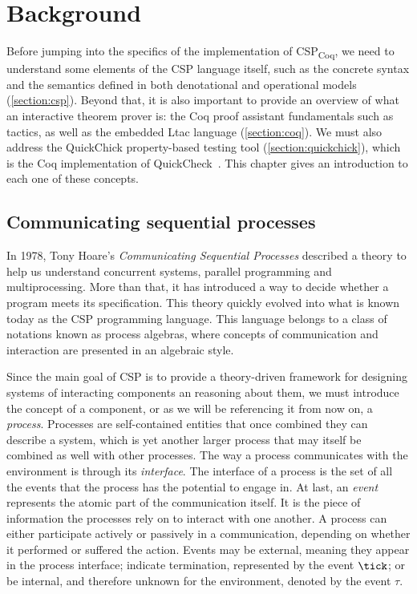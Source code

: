 \chapter{Background}
\label{chapter:background}

Before jumping into the specifics of the implementation of CSP\textsubscript{Coq}, we need to understand some elements of the CSP language itself, such as the concrete syntax and the semantics defined in both denotational and operational models (\autoref{section:csp}). Beyond that, it is also important to provide an overview of what an interactive theorem prover is: the Coq proof assistant fundamentals such as tactics, as well as the embedded Ltac language (\autoref{section:coq}). We must also address the QuickChick property-based testing tool (\autoref{section:quickchick}), which is the Coq implementation of QuickCheck~\cite{hughes:quickcheck2000}. This chapter gives an introduction to each one of these concepts.

\section{Communicating sequential processes}
\label{section:csp}

In 1978, Tony Hoare's \emph{Communicating Sequential Processes} \cite{hoare:csp} described a theory to help us understand concurrent systems, parallel programming and multiprocessing. More than that, it has introduced a way to decide whether a program meets its specification. This theory quickly evolved into what is known today as the CSP programming language. This language belongs to a class of notations known as process algebras, where concepts of communication and interaction are presented in an algebraic style.

Since the main goal of CSP is to provide a theory-driven framework for designing systems of interacting components an reasoning about them, we must introduce the concept of a component, or as we will be referencing it from now on, a \emph{process}. Processes are self-contained entities that once combined they can describe a system, which is yet another larger process that may itself be combined as well with other processes. The way a process communicates with the environment is through its \emph{interface}. The interface of a process is the set of all the events that the process has the potential to engage in. At last, an \emph{event} represents the atomic part of the communication itself. It is the piece of information the processes rely on to interact with one another. A process can either participate actively or passively in a communication, depending on whether it performed or suffered the action. Events may be external, meaning they appear in the process interface; indicate termination, represented by the event $ \tick $; or be internal, and therefore unknown for the environment, denoted by the event $ \tau $.

